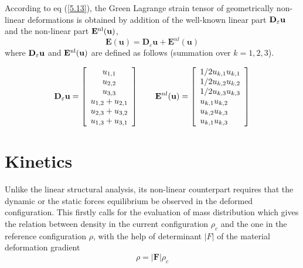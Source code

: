 According to eq (\ref{5.13}), the Green Lagrange strain tensor of geometrically non-linear
deformations is obtained by addition of the well-known linear part ${\bf D}_\varepsilon \bf u$ and the non-linear part $\bf E^\textnormal{nl}(u)$,
\begin{equation}
 \boldsymbol{E}(\boldsymbol{u})=\mathbf{D}_{\varepsilon} \boldsymbol{u}+\boldsymbol{E}^{n l}(\boldsymbol{u}) 
\end{equation}
where  ${\bf D}_\varepsilon \bf u$ and $\bf E^\textnormal{nl}(u)$ are defined as follows (summation over $k = 1, 2, 3$).

\begin{equation}
    {{\bf{D}}_\varepsilon }{\bf{u}} = \left[ {\begin{array}{*{20}{c}}
{{u_{1,1}}}\\
{{u_{2,2}}}\\
{{u_{3,3}}}\\
{{u_{1,2}} + {u_{2,1}}}\\
{{u_{2,3}} + {u_{3,2}}}\\
{{u_{1,3}} + {u_{3,1}}}
\end{array}} \right]\qquad {{\bf{E}}^{nl}}({\bf{u}}) = \left[ {\begin{array}{*{20}{l}}
{1/2}{{u_{k,1}}}{{u_{k,1}}}\\
{1/2}{{u_{k,2}}}{{u_{k,2}}}\\
{1/2}{{u_{k,3}}}{{u_{k,3}}}\\
{{u_{k,1}}}{{u_{k,2}}}{}\\
{{u_{k,2}}}{{u_{k,3}}}{}\\
{{u_{k,1}}}{{u_{k,3}}}{}
\end{array}} \right]
\end{equation}

\section{Kinetics}

Unlike the linear structural analysis, its non-linear counterpart requires that the dynamic or
the static forces equilibrium be observed in the deformed configuration. This firstly calls for
the evaluation of mass distribution which gives the relation between density in the current
configuration $\rho_c$ and the one in the reference configuration $\rho$, with the help of determinant $|F|$ of the material deformation gradient
\begin{equation}
 \rho=|\boldsymbol{F}| \rho_{c} 
 \label{eqn:5.18} 
\end{equation}

